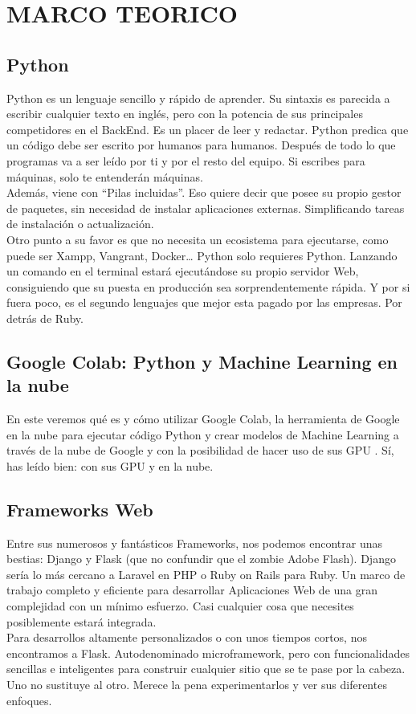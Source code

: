 \section{MARCO TEORICO} 


\subsection{Python}
	
Python es un lenguaje sencillo y rápido de aprender. Su sintaxis es parecida a escribir cualquier texto en inglés, pero con la potencia de sus principales competidores en el BackEnd.
Es un placer de leer y redactar. Python predica que un código debe ser escrito por humanos para humanos. Después de todo lo que programas va a ser leído por ti y por el resto del equipo. Si escribes para máquinas, solo te entenderán máquinas.
\\
Además, viene con “Pilas incluidas”. Eso quiere decir que posee su propio gestor de paquetes, sin necesidad de instalar aplicaciones externas. Simplificando tareas de instalación o actualización.
\\
Otro punto a su favor es que no necesita un ecosistema para ejecutarse, como puede ser Xampp, Vangrant, Docker… Python solo requieres Python. Lanzando un comando en el terminal estará ejecutándose su propio servidor Web, consiguiendo que su puesta en producción sea sorprendentemente rápida.
Y por si fuera poco, es el segundo lenguajes que mejor esta pagado por las empresas. Por detrás de Ruby.

\subsection{Google Colab: Python y Machine Learning en la nube}
En este veremos qué es y cómo utilizar Google Colab, la herramienta de Google en la nube para ejecutar código Python y crear modelos de Machine Learning a través de la nube de Google y con la posibilidad de hacer uso de sus GPU . Sí, has leído bien: con sus GPU y en la nube.


		
\subsection{Frameworks Web}

Entre sus numerosos y fantásticos Frameworks, nos podemos encontrar unas bestias: Django y Flask (que no confundir que el zombie Adobe Flash).
Django sería lo más cercano a Laravel en PHP o Ruby on Rails para Ruby. Un marco de trabajo completo y eficiente para desarrollar Aplicaciones Web de una gran complejidad con un mínimo esfuerzo. Casi cualquier cosa que necesites posiblemente estará integrada.
\\
Para desarrollos altamente personalizados o con unos tiempos cortos, nos encontramos a Flask. Autodenominado microframework, pero con funcionalidades sencillas e inteligentes para construir cualquier sitio que se te pase por la cabeza.
Uno no sustituye al otro. Merece la pena experimentarlos y ver sus diferentes enfoques. 


